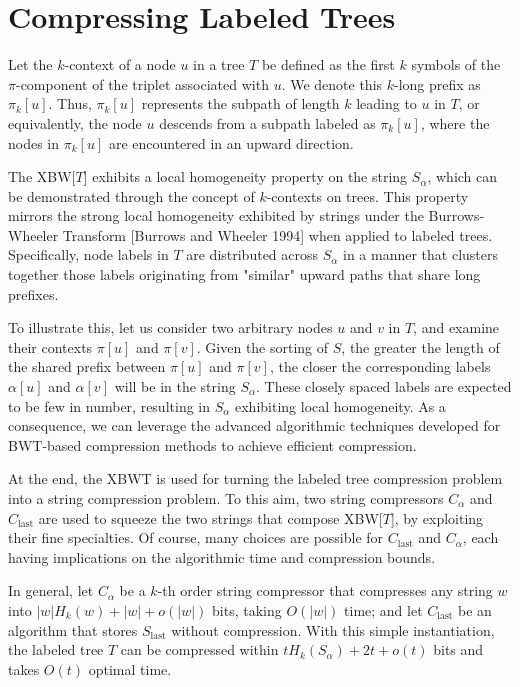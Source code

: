 \section{Compressing Labeled Trees}
Let the $k$-context of a node $u$ in a tree $T$ be defined as the first $k$ symbols of the $\pi$-component of the triplet associated with $u$. We denote this $k$-long prefix as $\pi_k[u]$. Thus, $\pi_k[u]$ represents the subpath of length $k$ leading to $u$ in $T$, or equivalently, the node $u$ descends from a subpath labeled as $\pi_k[u]$, where the nodes in $\pi_k[u]$ are encountered in an upward direction.

The XBW[$T$] exhibits a local homogeneity property on the string $S_{\alpha}$, which can be demonstrated through the concept of $k$-contexts on trees. This property mirrors the strong local homogeneity exhibited by strings under the Burrows-Wheeler Transform [Burrows and Wheeler 1994] when applied to labeled trees. Specifically, node labels in $T$ are distributed across $S_{\alpha}$ in a manner that clusters together those labels originating from "similar" upward paths that share long prefixes. 

To illustrate this, let us consider two arbitrary nodes $u$ and $v$ in $T$, and examine their contexts $\pi[u]$ and $\pi[v]$. Given the sorting of $S$, the greater the length of the shared prefix between $\pi[u]$ and $\pi[v]$, the closer the corresponding labels $\alpha[u]$ and $\alpha[v]$ will be in the string $S_{\alpha}$. These closely spaced labels are expected to be few in number, resulting in $S_{\alpha}$ exhibiting local homogeneity. As a consequence, we can leverage the advanced algorithmic techniques developed for BWT-based compression methods to achieve efficient compression.

At the end, the XBWT is used for turning the labeled tree compression problem into a string compression problem. To this aim, two string compressors
$C_{\alpha}$ and $C_{\text{last}}$ are used to squeeze the two strings that compose XBW[$T$], by exploiting their fine specialties. Of course, many choices are possible for $C_{\text{last}}$ and $C_{\alpha}$, each having implications on the algorithmic time and compression bounds.

In general, let $C_{\alpha}$ be a $k$-th order string compressor that compresses any string $w$ into $|w|H_k(w) + |w| + o(|w|)$ bits, taking $O(|w|)$ time; and let $C_{\text{last}}$ be an algorithm that stores $S_{\text{last}}$ without compression. With this simple instantiation, the labeled tree $T$ can be compressed within $t H_k(S_{\alpha}) + 2t + o(t)$ bits and takes $O(t)$ optimal time.

